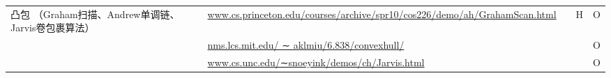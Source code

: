\begin{center}
\begin{longtable}{p{4cm} p{8cm} l l l}
凸包 （Graham扫描、Andrew单调链、Jarvis卷包裹算法） & \url{www.cs.princeton.edu/courses/archive/spr10/cos226/demo/ah/GrahamScan.html} & & H & O \\
&\url{nms.lcs.mit.edu/ ∼ aklmiu/6.838/convexhull/} & & & O \\
&\url{www.cs.unc.edu/∼snoeyink/demos/ch/Jarvis.html} & & & O \\
\end{longtable}
\end{center}

\vspace{-5pt}
